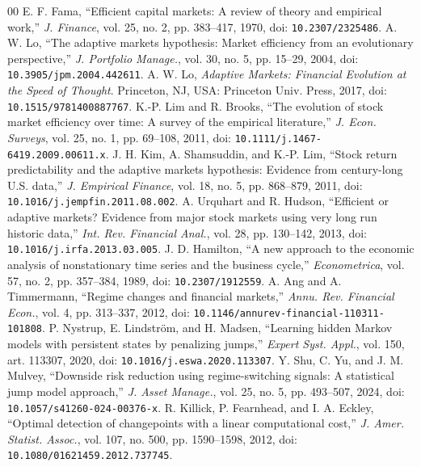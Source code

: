 \documentclass[conference]{IEEEtran}
\begin{document}
\begin{thebibliography}{00}
 E. F. Fama, ``Efficient capital markets: A review of theory and empirical work,'' \textit{J. Finance}, vol. 25, no. 2, pp. 383--417, 1970, doi: \nolinkurl{10.2307/2325486}.
 A. W. Lo, ``The adaptive markets hypothesis: Market efficiency from an evolutionary perspective,'' \textit{J. Portfolio Manage.}, vol. 30, no. 5, pp. 15--29, 2004, doi: \nolinkurl{10.3905/jpm.2004.442611}.
 A. W. Lo, \textit{Adaptive Markets: Financial Evolution at the Speed of Thought}. Princeton, NJ, USA: Princeton Univ. Press, 2017, doi: \nolinkurl{10.1515/9781400887767}.
 K.-P. Lim and R. Brooks, ``The evolution of stock market efficiency over time: A survey of the empirical literature,'' \textit{J. Econ. Surveys}, vol. 25, no. 1, pp. 69--108, 2011, doi: \nolinkurl{10.1111/j.1467-6419.2009.00611.x}.
 J. H. Kim, A. Shamsuddin, and K.-P. Lim, ``Stock return predictability and the adaptive markets hypothesis: Evidence from century-long U.S. data,'' \textit{J. Empirical Finance}, vol. 18, no. 5, pp. 868--879, 2011, doi: \nolinkurl{10.1016/j.jempfin.2011.08.002}.
 A. Urquhart and R. Hudson, ``Efficient or adaptive markets? Evidence from major stock markets using very long run historic data,'' \textit{Int. Rev. Financial Anal.}, vol. 28, pp. 130--142, 2013, doi: \nolinkurl{10.1016/j.irfa.2013.03.005}.
 J. D. Hamilton, ``A new approach to the economic analysis of nonstationary time series and the business cycle,'' \textit{Econometrica}, vol. 57, no. 2, pp. 357--384, 1989, doi: \nolinkurl{10.2307/1912559}.
 A. Ang and A. Timmermann, ``Regime changes and financial markets,'' \textit{Annu. Rev. Financial Econ.}, vol. 4, pp. 313--337, 2012, doi: \nolinkurl{10.1146/annurev-financial-110311-101808}.
 P. Nystrup, E. Lindstr\"om, and H. Madsen, ``Learning hidden Markov models with persistent states by penalizing jumps,'' \textit{Expert Syst. Appl.}, vol. 150, art. 113307, 2020, doi: \nolinkurl{10.1016/j.eswa.2020.113307}.
 Y. Shu, C. Yu, and J. M. Mulvey, ``Downside risk reduction using regime-switching signals: A statistical jump model approach,'' \textit{J. Asset Manage.}, vol. 25, no. 5, pp. 493--507, 2024, doi: \nolinkurl{10.1057/s41260-024-00376-x}.
 R. Killick, P. Fearnhead, and I. A. Eckley, ``Optimal detection of changepoints with a linear computational cost,'' \textit{J. Amer. Statist. Assoc.}, vol. 107, no. 500, pp. 1590--1598, 2012, doi: \nolinkurl{10.1080/01621459.2012.737745}.

\end{thebibliography}
\end{document}
